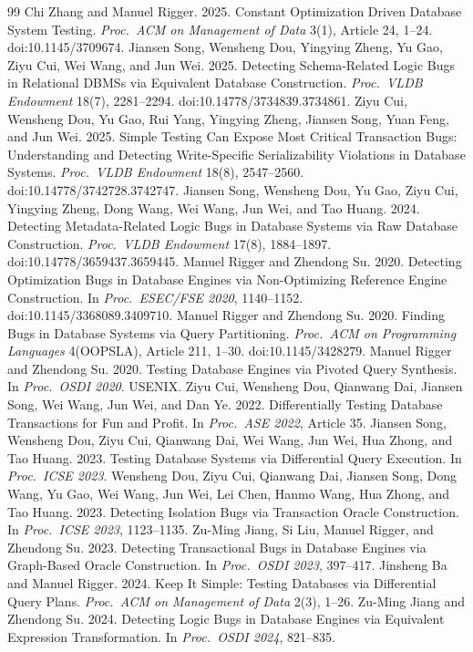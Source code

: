 \begin{thebibliography}{99}\scriptsize\setlength{\itemsep}{0pt}
 Chi Zhang and Manuel Rigger. 2025. Constant Optimization Driven Database System Testing. \emph{Proc.\ ACM on Management of Data} 3(1), Article 24, 1--24. doi:10.1145/3709674.
 Jiansen Song, Wensheng Dou, Yingying Zheng, Yu Gao, Ziyu Cui, Wei Wang, and Jun Wei. 2025. Detecting Schema-Related Logic Bugs in Relational DBMSs via Equivalent Database Construction. \emph{Proc.\ VLDB Endowment} 18(7), 2281--2294. doi:10.14778/3734839.3734861.
 Ziyu Cui, Wensheng Dou, Yu Gao, Rui Yang, Yingying Zheng, Jiansen Song, Yuan Feng, and Jun Wei. 2025. Simple Testing Can Expose Most Critical Transaction Bugs: Understanding and Detecting Write-Specific Serializability Violations in Database Systems. \emph{Proc.\ VLDB Endowment} 18(8), 2547--2560. doi:10.14778/3742728.3742747.
 Jiansen Song, Wensheng Dou, Yu Gao, Ziyu Cui, Yingying Zheng, Dong Wang, Wei Wang, Jun Wei, and Tao Huang. 2024. Detecting Metadata-Related Logic Bugs in Database Systems via Raw Database Construction. \emph{Proc.\ VLDB Endowment} 17(8), 1884--1897. doi:10.14778/3659437.3659445.
 Manuel Rigger and Zhendong Su. 2020. Detecting Optimization Bugs in Database Engines via Non-Optimizing Reference Engine Construction. In \emph{Proc.\ ESEC/FSE 2020}, 1140--1152. doi:10.1145/3368089.3409710.
 Manuel Rigger and Zhendong Su. 2020. Finding Bugs in Database Systems via Query Partitioning. \emph{Proc.\ ACM on Programming Languages} 4(OOPSLA), Article 211, 1--30. doi:10.1145/3428279.
 Manuel Rigger and Zhendong Su. 2020. Testing Database Engines via Pivoted Query Synthesis. In \emph{Proc.\ OSDI 2020}. USENIX.
 Ziyu Cui, Wensheng Dou, Qianwang Dai, Jiansen Song, Wei Wang, Jun Wei, and Dan Ye. 2022. Differentially Testing Database Transactions for Fun and Profit. In \emph{Proc.\ ASE 2022}, Article 35.
 Jiansen Song, Wensheng Dou, Ziyu Cui, Qianwang Dai, Wei Wang, Jun Wei, Hua Zhong, and Tao Huang. 2023. Testing Database Systems via Differential Query Execution. In \emph{Proc.\ ICSE 2023}.
 Wensheng Dou, Ziyu Cui, Qianwang Dai, Jiansen Song, Dong Wang, Yu Gao, Wei Wang, Jun Wei, Lei Chen, Hanmo Wang, Hua Zhong, and Tao Huang. 2023. Detecting Isolation Bugs via Transaction Oracle Construction. In \emph{Proc.\ ICSE 2023}, 1123--1135.
 Zu-Ming Jiang, Si Liu, Manuel Rigger, and Zhendong Su. 2023. Detecting Transactional Bugs in Database Engines via Graph-Based Oracle Construction. In \emph{Proc.\ OSDI 2023}, 397--417.
 Jinsheng Ba and Manuel Rigger. 2024. Keep It Simple: Testing Databases via Differential Query Plans. \emph{Proc.\ ACM on Management of Data} 2(3), 1--26.
 Zu-Ming Jiang and Zhendong Su. 2024. Detecting Logic Bugs in Database Engines via Equivalent Expression Transformation. In \emph{Proc.\ OSDI 2024}, 821--835.
\end{thebibliography}
